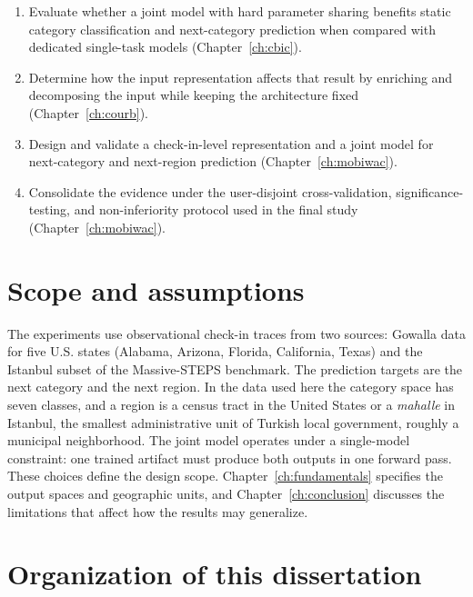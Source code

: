 \begin{enumerate}
    \item Evaluate whether a joint model with hard parameter sharing benefits static
    category classification and next-category prediction when compared with
    dedicated single-task models (Chapter~\ref{ch:cbic}).
    \item Determine how the input representation affects that result by enriching and
    decomposing the input while keeping the architecture fixed
    (Chapter~\ref{ch:courb}).
    \item Design and validate a check-in-level representation and a joint model for
    next-category and next-region prediction (Chapter~\ref{ch:mobiwac}).
    \item Consolidate the evidence under the user-disjoint cross-validation,
    significance-testing, and non-inferiority protocol used in the final study
    (Chapter~\ref{ch:mobiwac}).
\end{enumerate}



\section{Scope and assumptions}
\label{sec:intro:scope}

The experiments use observational check-in traces from two sources: Gowalla data for
five U.S. states (Alabama, Arizona, Florida, California, Texas) and the Istanbul subset of the Massive-STEPS
benchmark.
The prediction targets are the next category and the next region. In the data used
here the category space has seven classes, and a region is a census tract in the United
States or a \emph{mahalle} in Istanbul, the smallest administrative unit of Turkish
local government, roughly a municipal neighborhood.
The joint model operates under a single-model constraint: one trained artifact must produce
both outputs in one forward pass. These choices define the design scope.
Chapter~\ref{ch:fundamentals} specifies the output spaces and geographic units, and
Chapter~\ref{ch:conclusion} discusses the limitations that affect how the results may
generalize.


\section{Organization of this dissertation}
\label{sec:intro:organization}

